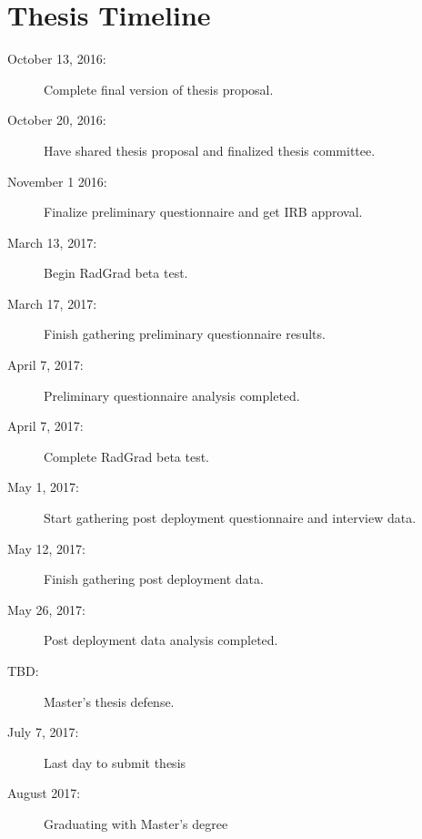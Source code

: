 \chapter{Thesis Timeline}
\begin{description}
\item[October 13, 2016:] Complete final version of thesis proposal. 
\item[October 20, 2016:] Have shared thesis proposal and finalized thesis committee.
\item[November 1 2016:] Finalize preliminary questionnaire and get IRB approval.
\item[March 13, 2017:] Begin RadGrad beta test.
\item[March 17, 2017:] Finish gathering preliminary questionnaire results.
\item[April 7, 2017:] Preliminary questionnaire analysis completed.
\item[April 7, 2017:] Complete RadGrad beta test.
\item[May 1, 2017:] Start gathering post deployment questionnaire and interview data.
\item[May 12, 2017:] Finish gathering post deployment data.
\item[May 26, 2017:] Post deployment data analysis completed.
\item[TBD:] Master's thesis defense.
\item[July 7, 2017:] Last day to submit thesis
\item[August 2017:] Graduating with Master's degree
\end{description}
